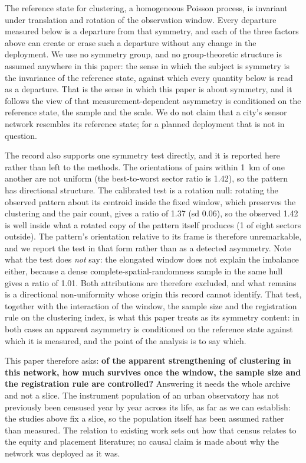 \documentclass[fleqn,10pt,lineno]{wlpeerj}
\newcommand{\isoRatio}{1.42}
\newcommand{\isoRotMean}{1.37}
\newcommand{\isoRotSd}{0.06}
\newcommand{\isoRotOutside}{1}
\newcommand{\isoWindowRatio}{1.01}
\begin{document}
The reference state for clustering, a homogeneous Poisson process, is invariant under
translation and rotation of the observation window. Every departure measured below is a
departure from that symmetry, and each of the three factors above can create or erase such a
departure without any change in the deployment. We use no symmetry group, and no
group-theoretic structure is assumed anywhere in this paper: the sense in which the subject is
symmetry is the invariance of the reference state, against which every quantity below is read
as a departure. That is the sense in which this paper is about
symmetry, and it follows the view of \citet{xia2026measurement} that
measurement-dependent asymmetry is conditioned on the reference state, the sample and the
scale. We do not claim that a city's sensor network resembles its reference state; for a planned
deployment that is not in question.

The record also supports one symmetry test directly, and it is reported here rather than left to
the methods. The orientations of pairs within \SI{1}{\kilo\meter} of one another are not uniform
(the best-to-worst sector ratio is \isoRatio), so the pattern has directional structure. The
calibrated test is a rotation null: rotating the observed pattern about its centroid inside the
fixed window, which preserves the clustering and the pair count, gives a ratio of
\isoRotMean{} (sd \isoRotSd), so the observed \isoRatio{} is well inside what a rotated copy of
the pattern itself produces (\isoRotOutside{} of eight sectors outside). The pattern's
orientation relative to its frame is therefore unremarkable, and we report the test in that form
rather than as a detected asymmetry. Note what the test does \emph{not} say: the elongated
window does not explain the imbalance either, because a dense complete-spatial-randomness sample
in the same hull gives a ratio of \num{\isoWindowRatio}. Both attributions are therefore
excluded, and what remains is a directional non-uniformity whose origin this record cannot
identify. That test, together with the interaction of the window, the sample size and the
registration rule on the clustering
index, is what this paper treats as its symmetry content: in both cases an apparent asymmetry is
conditioned on the reference state against which it is measured, and the point of the analysis is
to say which.

This paper therefore asks: \textbf{of the apparent strengthening of clustering in this network,
how much survives once the window, the sample size and the registration rule are controlled?}
Answering it needs the whole archive and not a slice. The instrument population of an urban
observatory has not previously been censused year by year across its life, as far as we can
establish: the studies above fix a slice, so the population itself has been assumed rather than
measured. The relation to existing work sets out how that census relates to the equity and placement
literature; no causal claim is made about why the network was deployed as it was.
\end{document}
